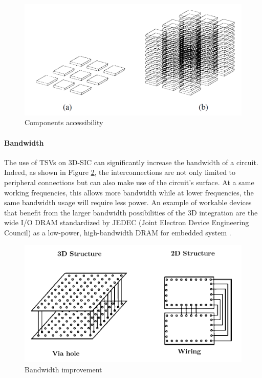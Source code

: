 \begin{figure}[h!]
\begin{center}
\includegraphics[width=0.8\linewidth]{accessibility.png}
\end{center}
\vspace{-0.5cm}
\caption{Components accessibility \cite{659500}}
\label{fig:accessibility}
\end{figure}

\paragraph{Bandwidth}

The use of TSVs on 3D-SIC can significantly increase the bandwidth of a circuit. Indeed, as shown in Figure \ref{fig:bandwidth}, the interconnections are not only limited to peripheral connections but can also make use of the circuit's surface. At a same working frequencies, this allows more bandwidth while at lower frequencies, the same bandwidth usage will require less power. An example of workable devices that benefit from the larger bandwidth possibilities of the 3D integration are the wide I/O DRAM standardized by JEDEC (Joint Electron Device Engineering Council) as a low-power, high-bandwidth DRAM for embedded system \cite{5746413,jedec2011,Zhang:2014:HWI:2591513.2591529}.

\begin{figure}[h!]
\begin{center}
\includegraphics[width=0.75\linewidth]{bandwidth.png}
\end{center}
\vspace{-0.5cm}
\caption{Bandwidth improvement \cite{659500}}
\label{fig:bandwidth}
\end{figure}

